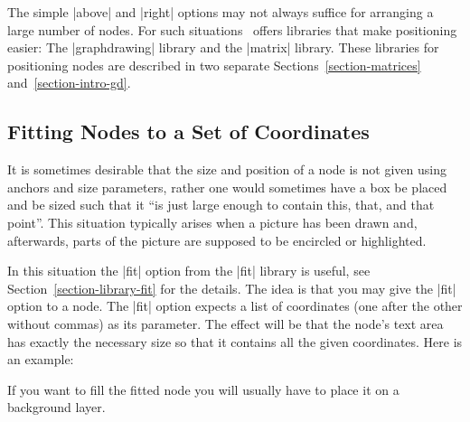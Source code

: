The simple |above| and |right| options may not always suffice for arranging a
large number of nodes. For such situations \tikzname\ offers libraries that
make positioning easier: The |graphdrawing| library and the |matrix| library.
These libraries for positioning nodes are described in two separate
Sections~\ref{section-matrices} and~\ref{section-intro-gd}.


\subsection{Fitting Nodes to a Set of Coordinates}
\label{section-nodes-fitting}

It is sometimes desirable that the size and position of a node is not given
using anchors and size parameters, rather one would sometimes have a box be
placed and be sized such that it ``is just large enough to contain this, that,
and that point''. This situation typically arises when a picture has been drawn
and, afterwards, parts of the picture are supposed to be encircled or
highlighted.

In this situation the |fit| option from the |fit| library is useful, see
Section~\ref{section-library-fit} for the details. The idea is that you may
give the |fit| option to a node. The |fit| option expects a list of coordinates
(one after the other without commas) as its parameter. The effect will be that
the node's text area has exactly the necessary size so that it contains all the
given coordinates. Here is an example:
%
\begin{codeexample}[preamble={\usetikzlibrary{fit,shapes.geometric}}]
\end{codeexample}

If you want to fill the fitted node you will usually have to place it on a
background layer.
%
\begin{codeexample}[preamble={\usetikzlibrary{backgrounds,fit,shapes.geometric}}]
\end{codeexample}


